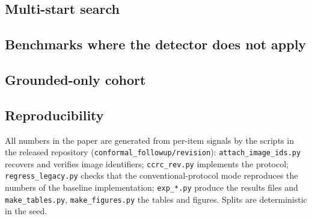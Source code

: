 \subsection{Multi-start search}
\label{app:multistart}
\begin{table}[h]
\centering
\caption{Certified coverage (\%, abort rate in parentheses) for the single starts $e_0=0$ and $e_0=1$ and for the union over $e_0\in\{0,1,2\}$ at $\delta/3$ each.}
\label{tab:multistart}
\small
\resizebox{\textwidth}{!}{}
\end{table}

\subsection{Benchmarks where the detector does not apply}
\begin{table}[h]
\centering
\caption{Filtering (confidence score, image-grouped folds, $400$ splits) where the detector does not apply.
Certified coverage (\%) with abort rate in parentheses.}
\label{tab:sweep}
\small
\resizebox{\textwidth}{!}{}
\end{table}

\subsection{Grounded-only cohort}
\label{app:grounded}
\begin{table}[h]
\centering
\caption{As Table~\ref{tab:main} restricted to items with a detector value; no bootstrap.}
\small
\resizebox{\textwidth}{!}{}
\end{table}

\subsection{Reproducibility}
All numbers in the paper are generated from per-item signals by the scripts in the released repository
(\texttt{conformal\_followup/revision}): \texttt{attach\_image\_ids.py} recovers and verifies image identifiers;
\texttt{ccrc\_rev.py} implements the protocol; \texttt{regress\_legacy.py} checks that the conventional-protocol mode reproduces the
numbers of the baseline implementation; \texttt{exp\_*.py} produce the results files and \texttt{make\_tables.py},
\texttt{make\_figures.py} the tables and figures. Splits are deterministic in the seed.
